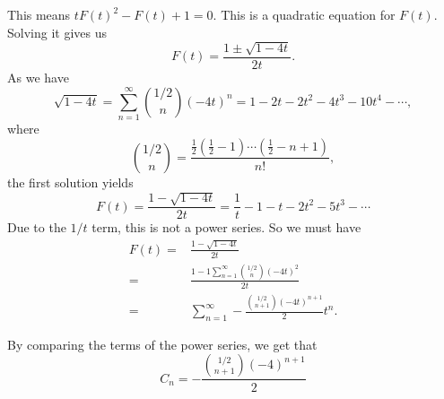  This means $t F(t)^2 - F(t) +1 = 0.$
 This is a quadratic equation for $F(t).$
 Solving it gives us
 $$ F(t) = \frac{1 \pm \sqrt{1 - 4t}}{2t}. $$
 As we have $$ \sqrt{1 - 4t} =
 \sum_{n=1}^{\infty} \binom{1/2}{n} (-4t)^n
 = 1 - 2t - 2t^2 - 4t^3 - 10 t^4 - \cdots,
 $$ where $$ \binom{1/2}{n} = \frac{ \frac{1}{2} ( \frac{1}{2} - 1 )
\cdots ( \frac{1}{2} -n + 1)}{n!},$$
the first solution yields
$$ F(t) = \frac{1 - \sqrt{1 - 4t}}{2t}
 = \frac{1}{t} - 1 - t - 2t^2 - 5 t^3 - \cdots$$
Due to the $1/t$ term, this is not a power series.
So we must have
\begin{align*}
	F(t) ={}& \frac{1 - \sqrt{1 - 4t}}{2t}\\
	={}& \frac{1 - 1 \sum_{n=1}^{\infty} \binom{1/2}{n} (-4t)^2}
	{2t} \\
	={}& \sum_{n=1}^{\infty}  - \frac{\binom{1/2}{n+1} (-4t)^{n+1}}{2} t^n.
\end{align*}

By comparing the terms of the power series, we get that
$$C_n = - \frac{\binom{1/2}{n+1} (-4)^{n+1} }{2} $$
